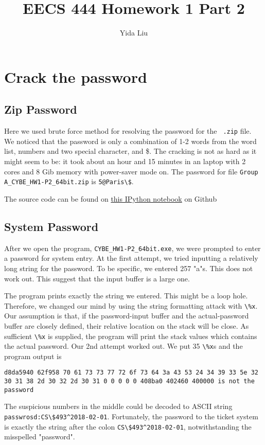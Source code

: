 \documentclass[11pt]{article}
\begin{document}
\author{Yida Liu}
\title{EECS 444 Homework 1 Part 2}
\maketitle

\section{Crack the password}

\subsection{Zip Password}

Here we used brute force method for resolving the password for the \lstinline{ .zip} file. We noticed that the password is only a combination of 1-2 words from the word list, numbers and two special character, \@ and \$. The cracking is not as hard as it might seem to be: it took about an hour and 15 minutes in an laptop with 2 cores and 8 Gib memory with power-saver mode on. The password for file \lstinline{Group A_CYBE_HW1-P2_64bit.zip} is \lstinline{5@Paris\$}.

The source code can be found on \href{https://github.com/Mestrace/EECS444-Computer-Security/blob/master/Assignment/1/Part2/crack\%20zip.ipynb}{this IPython notebook} on Github

\subsection{System Password}\label{syspw}

After we open the program, \lstinline{CYBE_HW1-P2_64bit.exe}, we were prompted to enter a password for system entry. At the first attempt, we tried inputting a relatively long string for the password. To be specific, we entered 257 "a"s. This does not work out. This suggest that the input buffer is a large one. 

The program prints exactly the string we entered. This might be a loop hole. Therefore, we changed our mind by using the string formatting attack with \lstinline{\%x}. Our assumption is that, if the password-input buffer and the actual-password buffer are closely defined, their relative location on the stack will be close. As sufficient \lstinline{\%x} is supplied, the program will print the stack values which contains the actual password. Our 2nd attempt worked out. We put 35 \lstinline{\%x}s and the program output is
\begin{lstlisting}
d8da5940 62f958 70 61 73 73 77 72 6f 73 64 3a 43 53 24 34 39 33 5e 32 30 31 38 2d 30 32 2d 30 31 0 0 0 0 0 408ba0 402460 400000 is not the password
\end{lstlisting}
The suspicious numbers in the middle could be decoded to ASCII string \lstinline{passwrosd:CS\$493^2018-02-01}. Fortunately, the password to the ticket system is exactly the string after the colon \lstinline{CS\$493^2018-02-01}, notwithstanding the misspelled "password". 
\end{document}
